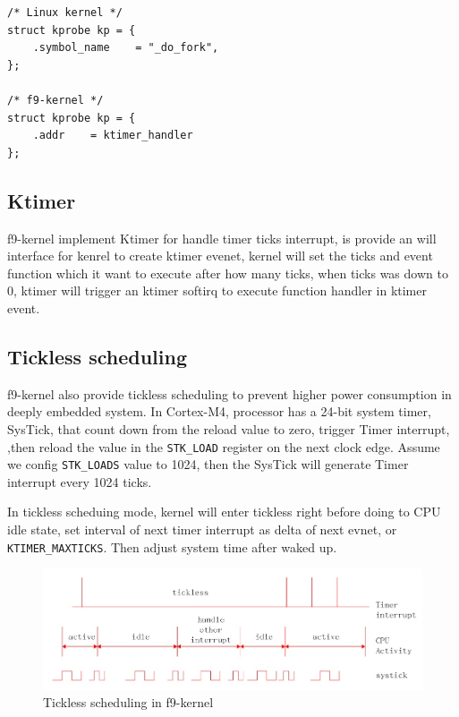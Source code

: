 \documentclass[10pt,preprint,nocopyrightspace]{sigplanconf}
\begin{document}
\begin{lstlisting}[basicstyle=\small,frame=single]
/* Linux kernel */
struct kprobe kp = {
    .symbol_name    = "_do_fork",
};

/* f9-kernel */
struct kprobe kp = {
    .addr    = ktimer_handler
};

\end{lstlisting}

\subsection{Ktimer}
f9-kernel implement Ktimer for handle timer ticks interrupt, is provide an will interface for kenrel to create ktimer evenet, kernel will set the ticks and event function which it want to execute after how many ticks, when ticks was down to 0, ktimer will trigger an ktimer softirq to execute function handler in ktimer event. 

\subsection{Tickless scheduling}

f9-kernel also provide tickless scheduling to prevent higher power consumption in deeply embedded system\cite{freertos1,freertos2}. In Cortex-M4, processor has a 24-bit system timer, SysTick, that count down from the reload value to zero, trigger Timer interrupt, ,then reload the value in the \verb|STK_LOAD| register on the next clock edge\cite{st2016manual}. Assume we config \verb|STK_LOADS| value to 1024, then the SysTick will generate Timer interrupt every 1024 ticks.

In tickless scheduing mode, kernel will enter tickless right before doing to CPU idle state, set interval of next timer interrupt as delta of next evnet, or \verb|KTIMER_MAXTICKS|. Then adjust system time after waked up.

\begin{figure}[H]
	\begin{center}
		\includegraphics[width=\linewidth]{picture/tickless.png}
	\end{center}
	\caption{Tickless scheduling in f9-kernel}
\end{figure}
\end{document}

